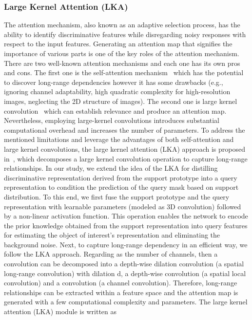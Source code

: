 \documentclass[runningheads]{llncs}
\begin{document}
\subsubsection{Large Kernel Attention (LKA)}
The attention mechanism, also known as an adaptive selection process, has the ability to identify discriminative features while disregarding noisy responses with respect to the input features. Generating an attention map that signifies the importance of various parts is one of the key roles of the attention mechanism. There are two well-known attention mechanisms and each one has its own pros and cons. The first one is the self-attention mechanism~\cite{dosovitskiy2020image} which has the potential to discover long-range dependencies however it has some drawbacks (e.g., ignoring channel adaptability, high quadratic complexity for high-resolution images, neglecting the 2D structure of images). The second one is large kernel convolution~\cite{park2018bam} which can establish relevance and produce an attention map. Nevertheless, employing large-kernel convolutions introduces substantial computational overhead and increases the number of parameters. To address the mentioned limitations and leverage the advantages of both self-attention and large kernel convolutions, the large kernel attention (LKA) approach is proposed in~\cite{guo2022visual}, which decomposes a large kernel convolution operation to capture long-range relationships.
In our study, we extend the idea of the LKA for distilling discriminative representation derived from the support prototype into a query representation to condition the prediction of the query mask based on support distribution. To this end, we first fuse the support prototype  and the query representation  with learnable parameters (modeled as 3D convolution) followed by a non-linear activation function. This operation enables the network to encode the prior knowledge obtained from the support representation into query features for estimating the object of interest's representation and eliminating the background noise. Next, to capture long-range dependency in an efficient way, we follow the LKA approach. Regarding  as the number of channels, then a  convolution can be decomposed into a  depth-wise dilation convolution (a spatial long-range convolution) with dilation d, a  depth-wise convolution (a spatial local convolution) and a  convolution (a channel convolution). Therefore, long-range relationships can be extracted within a feature space and the attention map is generated with a few computational complexity and parameters. The large kernel attention (LKA) module is written as
\end{document}
